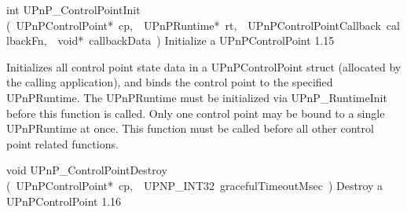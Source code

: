 \documentclass{article}
\begin{document}
\begin{cxxentry}
\begin{cxxfunction}
\begin{cxxdoc}
\end{cxxdoc}
\end{cxxfunction}
\begin{cxxfunction}
{int}
        {UPnP\_ControlPointInit}
        {(\ UPnPControlPoint*\ cp,\ \ UPnPRuntime*\ rt,\ \ UPnPControlPointCallback\ callbackFn,\ \ void*\ callbackData\ )}
        {Initialize a UPnPControlPoint }
        {1.15}
\begin{cxxdoc}

Initializes all control point state data in a UPnPControlPoint
struct (allocated by the calling application), and binds the
control point to the specified UPnPRuntime. The UPnPRuntime
must be initialized via UPnP\_RuntimeInit before this function
is called.  Only one control point may be bound to a single
UPnPRuntime at once.  This function must be called before
all other control point related functions.


\end{cxxdoc}
\end{cxxfunction}
\begin{cxxfunction}
{void}
        {UPnP\_ControlPointDestroy}
        {(\ UPnPControlPoint*\ cp,\ \ UPNP\_INT32\ gracefulTimeoutMsec\ )}
        {Destroy a UPnPControlPoint }
        {1.16}
\begin{cxxdoc}


\end{cxxdoc}
\end{cxxfunction}
\end{cxxentry}
\end{document}
